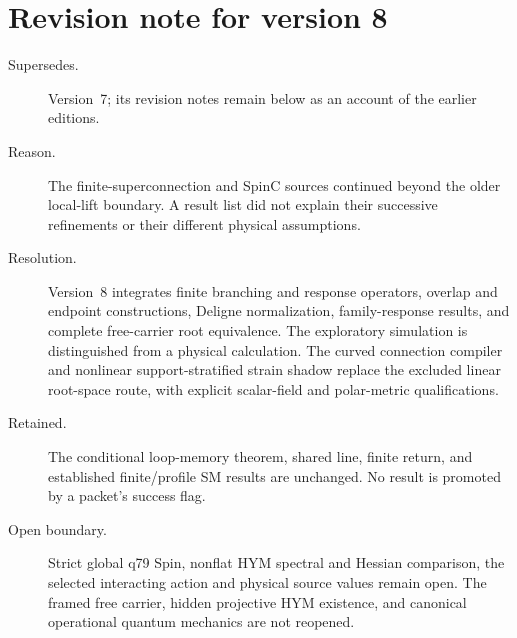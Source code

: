 \documentclass[11pt]{article}
\begin{document}
\section*{Revision note for version 8}
\begin{description}
\item[Supersedes.] Version~7; its revision notes remain below as an account
of the earlier editions.
\item[Reason.] The finite-superconnection and SpinC sources continued beyond
the older local-lift boundary. A result list did not explain their successive
refinements or their different physical assumptions.
\item[Resolution.] Version~8 integrates finite branching and response
operators, overlap and endpoint constructions, Deligne normalization,
family-response results, and complete free-carrier root equivalence. The
exploratory simulation is distinguished from a physical calculation.
The curved connection compiler and nonlinear support-stratified strain
shadow replace the excluded linear root-space route, with explicit scalar-field
and polar-metric qualifications.
\item[Retained.] The conditional loop-memory theorem, shared line, finite
return, and established finite/profile SM results are unchanged. No result is
promoted by a packet's success flag.
\item[Open boundary.] Strict global q79 Spin, nonflat HYM spectral and
Hessian comparison, the selected interacting action and physical source values
remain open. The framed free carrier, hidden projective HYM existence, and
canonical operational quantum mechanics are not reopened.
\end{description}
\end{document}

